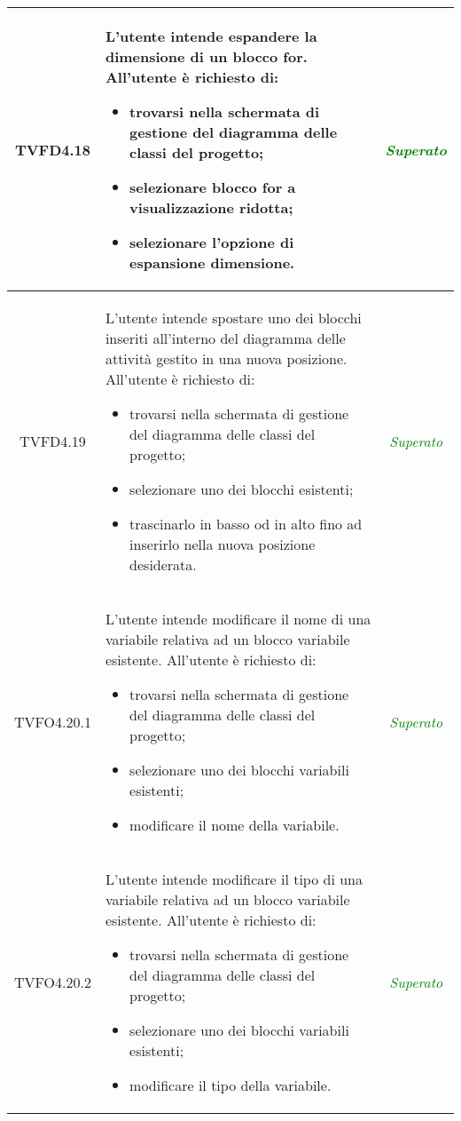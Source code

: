 \begin{longtable}{|c|>{}m{8cm}|c|}
\hypertarget{TVFD4.18}{TVFD4.18} & L'utente intende espandere la dimensione di un blocco for.
All'utente è richiesto di:
\begin{itemize}
	\item trovarsi nella schermata di gestione del diagramma delle classi del progetto;
	\item selezionare blocco for a visualizzazione ridotta;
	\item selezionare l'opzione di espansione dimensione.
\end{itemize} & \textcolor{Green}{\textit{Superato}}\\ \hline

\hypertarget{TVFD4.19}{TVFD4.19} & L'utente intende spostare uno dei blocchi inseriti all’interno del diagramma delle attività gestito in una nuova posizione.
All'utente è richiesto di:
\begin{itemize}
	\item trovarsi nella schermata di gestione del diagramma delle classi del progetto;
	\item selezionare uno dei blocchi esistenti;
	\item trascinarlo in basso od in alto fino ad inserirlo nella nuova posizione desiderata.
\end{itemize} & \textcolor{Green}{\textit{Superato}}\\ \hline

\hypertarget{TVFO4.20.1}{TVFO4.20.1} & L'utente intende modificare il nome di una variabile relativa ad un blocco variabile esistente.
All'utente è richiesto di:
\begin{itemize}
	\item trovarsi nella schermata di gestione del diagramma delle classi del progetto;
	\item selezionare uno dei blocchi variabili esistenti;
	\item modificare il nome della variabile.
\end{itemize} & \textcolor{Green}{\textit{Superato}}\\ \hline

\hypertarget{TVFO4.20.2}{TVFO4.20.2} & L'utente intende modificare il tipo di una variabile relativa ad un blocco variabile esistente.
All'utente è richiesto di:
\begin{itemize}
	\item trovarsi nella schermata di gestione del diagramma delle classi del progetto;
	\item selezionare uno dei blocchi variabili esistenti;
	\item modificare il tipo della variabile.
\end{itemize} & \textcolor{Green}{\textit{Superato}}\\ \hline


\end{longtable}
